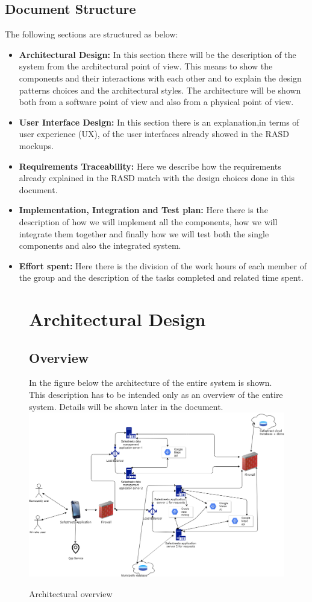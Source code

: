 \documentclass[titlepage]{article}
\begin{document}
\subsection{Document Structure}
The following sections are structured as below:
\begin{itemize}
	\item \textbf{Architectural Design: }In this section there will be the description of the system from the architectural point of view. This means to show the components and their interactions with each other and to explain the design patterns choices and the architectural styles. The architecture will be shown both from a software point of view and also from a physical point of view.
	\item \textbf{User Interface Design:} In this section there is an explanation,in terms of user experience (UX), of the user interfaces already showed in the RASD mockups.
	\item \textbf{Requirements Traceability:} Here we describe how the requirements already explained in the RASD match with the design choices done in this document.
	\item \textbf{Implementation, Integration and Test plan:} Here there is the description of how we will implement all the components, how we will integrate them together and finally how we will test both the single components and also the integrated system.
	\item \textbf{Effort spent:} Here there is the division of the work hours of each member of the group and the description of the tasks completed and related time spent.
\end{itemize}
\begin{figure}[h]
\section{Architectural Design}
	\subsection{Overview}
In the figure below the architecture of the entire system is shown. This description has to be intended only as an overview of the entire system. Details will be shown later in the document.
	\includegraphics[scale=0.419]{Diagrams/overview.png}
	\caption{Architectural overview}
\end{figure}
\end{document}
